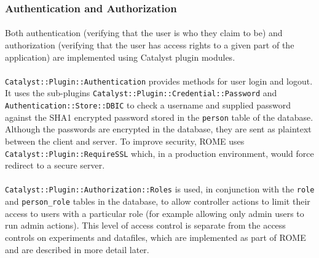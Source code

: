 \subsubsection{Authentication and Authorization}

\paragraph{}
Both authentication (verifying that the user is who they claim to be) and authorization (verifying that the user has access rights to a given part of the application) are implemented using Catalyst plugin modules. 

\paragraph{}
\texttt{Catalyst::Plugin::Authentication} provides methods for user login and logout. It uses the sub-plugins \texttt{Catalyst::Plugin::Credential::Password} and \texttt{Authentication::Store::DBIC} to check a username and supplied password against the SHA1 encrypted password stored in the \texttt{person} table of the database. Although the passwords are encrypted in the database, they are sent as plaintext between the client and server. To improve security, ROME uses \texttt{Catalyst::Plugin::RequireSSL} which, in a production environment, would force redirect to a secure server.

\paragraph{}
\texttt{Catalyst::Plugin::Authorization::Roles} is used, in conjunction with the \texttt{role} and \texttt{person\_role} tables in the database, to allow controller actions to limit their access to users with a particular role (for example allowing only admin users to run admin actions). This level of access control is separate from the access controls on experiments and datafiles, which are implemented as part of ROME and are described in more detail later.
